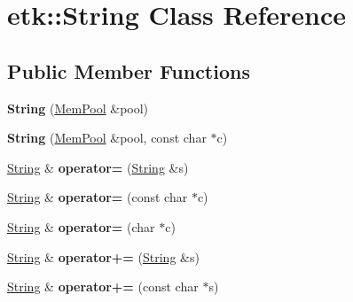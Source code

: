 \hypertarget{classetk_1_1_string}{\section{etk\-:\-:String Class Reference}
\label{classetk_1_1_string}
}
\subsection*{Public Member Functions}
\begin{DoxyCompactItemize}
\item 
\hypertarget{classetk_1_1_string_a0700e02e7ff0367edd3314feef4505ac}{{\bfseries String} (\hyperlink{classetk_1_1_mem_pool}{Mem\-Pool} \&pool)}\label{classetk_1_1_string_a0700e02e7ff0367edd3314feef4505ac}

\item 
\hypertarget{classetk_1_1_string_aed075f8169c96d70bb6fe4917ecbb103}{{\bfseries String} (\hyperlink{classetk_1_1_mem_pool}{Mem\-Pool} \&pool, const char $\ast$c)}\label{classetk_1_1_string_aed075f8169c96d70bb6fe4917ecbb103}

\item 
\hypertarget{classetk_1_1_string_a6fda1c9f98ea6d9da07f468cad0c9ef2}{\hyperlink{classetk_1_1_string}{String} \& {\bfseries operator=} (\hyperlink{classetk_1_1_string}{String} \&s)}\label{classetk_1_1_string_a6fda1c9f98ea6d9da07f468cad0c9ef2}

\item 
\hypertarget{classetk_1_1_string_a92cec62ecd69518d31047ccfd6bc9c4d}{\hyperlink{classetk_1_1_string}{String} \& {\bfseries operator=} (const char $\ast$c)}\label{classetk_1_1_string_a92cec62ecd69518d31047ccfd6bc9c4d}

\item 
\hypertarget{classetk_1_1_string_a407c0974c1ea12d8379c000c66c5ea0f}{\hyperlink{classetk_1_1_string}{String} \& {\bfseries operator=} (char $\ast$c)}\label{classetk_1_1_string_a407c0974c1ea12d8379c000c66c5ea0f}

\item 
\hypertarget{classetk_1_1_string_aabb35821dceb9bc1a6178131b127d35e}{\hyperlink{classetk_1_1_string}{String} \& {\bfseries operator+=} (\hyperlink{classetk_1_1_string}{String} \&s)}\label{classetk_1_1_string_aabb35821dceb9bc1a6178131b127d35e}

\item 
\hypertarget{classetk_1_1_string_a57892b5280ec9c1e93dce8864324ee40}{\hyperlink{classetk_1_1_string}{String} \& {\bfseries operator+=} (const char $\ast$s)}\label{classetk_1_1_string_a57892b5280ec9c1e93dce8864324ee40}


\end{DoxyCompactItemize}
